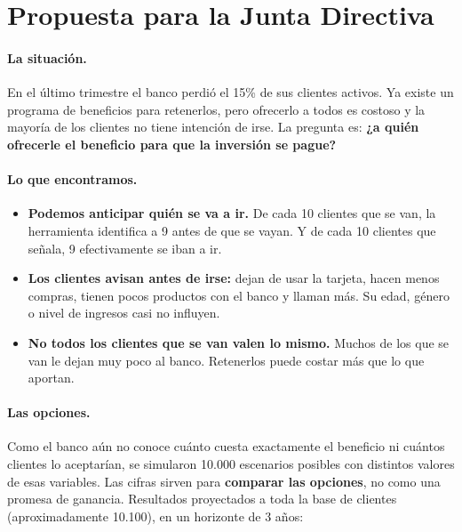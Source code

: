 \documentclass[11pt,a4paper]{article}
\begin{document}
\newpage
\section{Propuesta para la Junta Directiva}
\label{sec:junta}

\paragraph{La situación.} En el último trimestre el banco perdió el 15\% de sus clientes activos. Ya existe un programa de beneficios para retenerlos, pero ofrecerlo a todos es costoso y la mayoría de los clientes no tiene intención de irse. La pregunta es: \textbf{¿a quién ofrecerle el beneficio para que la inversión se pague?}

\paragraph{Lo que encontramos.}
\begin{itemize}
  \item \textbf{Podemos anticipar quién se va a ir.} De cada 10 clientes que se van, la herramienta identifica a 9 antes de que se vayan. Y de cada 10 clientes que señala, 9 efectivamente se iban a ir.
  \item \textbf{Los clientes avisan antes de irse:} dejan de usar la tarjeta, hacen menos compras, tienen pocos productos con el banco y llaman más. Su edad, género o nivel de ingresos casi no influyen.
  \item \textbf{No todos los clientes que se van valen lo mismo.} Muchos de los que se van le dejan muy poco al banco. Retenerlos puede costar más que lo que aportan.
\end{itemize}

\paragraph{Las opciones.} Como el banco aún no conoce cuánto cuesta exactamente el beneficio ni cuántos clientes lo aceptarían, se simularon 10.000 escenarios posibles con distintos valores de esas variables. Las cifras sirven para \textbf{comparar las opciones}, no como una promesa de ganancia. Resultados proyectados a toda la base de clientes (aproximadamente 10.100), en un horizonte de 3 años:
\end{document}
